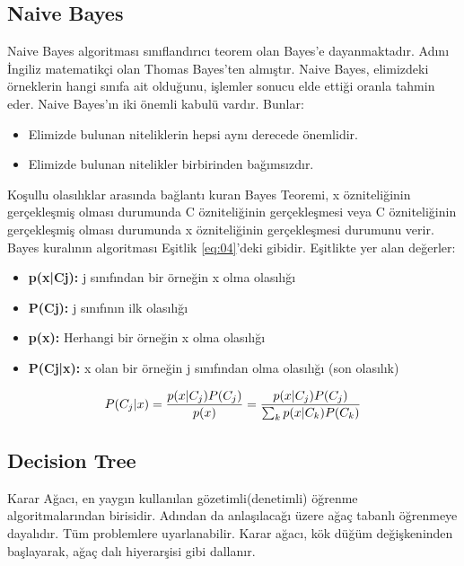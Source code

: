 \documentclass[conference]{IEEEtran}
\begin{document}
\subsection{\textbf{Naive Bayes}}
\quad Naive Bayes algoritması sınıflandırıcı teorem olan Bayes’e dayanmaktadır\cite{15}. Adını İngiliz matematikçi olan Thomas Bayes’ten almıştır\cite{14}. Naive Bayes, elimizdeki örneklerin hangi sınıfa ait olduğunu, işlemler sonucu elde ettiği oranla tahmin eder. Naive Bayes’ın iki önemli kabulü vardır\cite{15}. Bunlar:
\begin{itemize}
\item Elimizde bulunan niteliklerin hepsi aynı derecede önemlidir.
\item Elimizde bulunan nitelikler birbirinden bağımsızdır.
\end{itemize}

\quad Koşullu olasılıklar arasında bağlantı kuran Bayes Teoremi, x özniteliğinin gerçekleşmiş olması durumunda C özniteliğinin gerçekleşmesi veya C özniteliğinin gerçekleşmiş olması durumunda x özniteliğinin gerçekleşmesi durumunu verir\cite{15}. Bayes kuralının algoritması Eşitlik \ref{eq:04}'deki gibidir. Eşitlikte yer alan değerler\cite{14}:

\begin{itemize}
\item \textbf{p(x|Cj):} j sınıfından bir örneğin x olma olasılığı
\item \textbf{P(Cj):} j sınıfının ilk olasılığı
\item \textbf{p(x):} Herhangi bir örneğin x olma olasılığı
\item \textbf{P(Cj|x):} x olan bir örneğin j sınıfından olma olasılığı (son olasılık)
\end{itemize}

\begin{equation}
\label{eq:04}
\Large P(C_{j}|x) = \frac {p(x|C_{j}) P(C_{j})} {p(x)} = \frac {p(x|C_{j}) P(C_{j})} {\sum_{k}^{}p(x|C_{k})P(C_{k})}
\end{equation}

\subsection{\textbf{Decision Tree}}
\quad Karar Ağacı, en yaygın kullanılan gözetimli(denetimli) öğrenme algoritmalarından birisidir. Adından da anlaşılacağı üzere ağaç tabanlı öğrenmeye dayalıdır. Tüm problemlere uyarlanabilir\cite{16}. Karar ağacı, kök düğüm değişkeninden başlayarak, ağaç dalı hiyerarşisi gibi dallanır\cite{17}.
\end{document}
